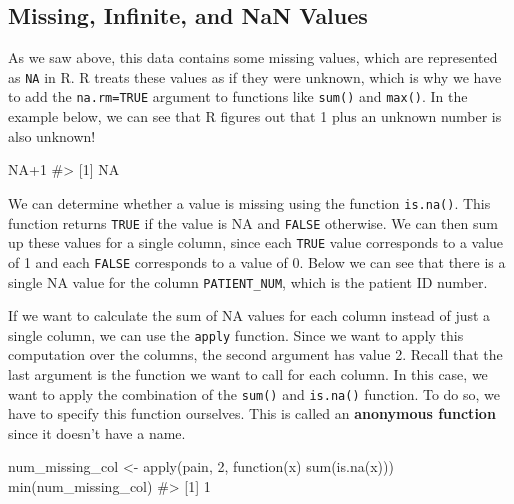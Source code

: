 \documentclass[
  letterpaper,
]{krantz}
\makeatletter
\newenvironment{Shaded}{\begin{snugshade}}{\end{snugshade}}
\newcommand{\CommentTok}[1]{\textcolor[rgb]{0.37,0.37,0.37}{#1}}
\newcommand{\ConstantTok}[1]{\textcolor[rgb]{0.56,0.35,0.01}{#1}}
\newcommand{\ControlFlowTok}[1]{\textcolor[rgb]{0.00,0.23,0.31}{#1}}
\newcommand{\DecValTok}[1]{\textcolor[rgb]{0.68,0.00,0.00}{#1}}
\newcommand{\FunctionTok}[1]{\textcolor[rgb]{0.28,0.35,0.67}{#1}}
\newcommand{\NormalTok}[1]{\textcolor[rgb]{0.00,0.23,0.31}{#1}}
\newcommand{\OtherTok}[1]{\textcolor[rgb]{0.00,0.23,0.31}{#1}}
\newcommand{\SpecialCharTok}[1]{\textcolor[rgb]{0.37,0.37,0.37}{#1}}
\newenvironment{kframe}{%
\medskip{}
\setlength{\fboxsep}{.8em}
 \def\at@end@of@kframe{}%
 \ifinner\ifhmode%
  \def\at@end@of@kframe{\end{minipage}}%
  \begin{minipage}{\columnwidth}%
 \fi\fi%
 \def\FrameCommand##1{\hskip\@totalleftmargin \hskip-\fboxsep
 \colorbox{shadecolor}{##1}\hskip-\fboxsep
     \hskip-\linewidth \hskip-\@totalleftmargin \hskip\columnwidth}%
 \MakeFramed {\advance\hsize-\width
   \@totalleftmargin\z@ \linewidth\hsize
   \@setminipage}}%
 {\par\unskip\endMakeFramed%
 \at@end@of@kframe}
\renewenvironment{Shaded}{\begin{kframe}}{\end{kframe}}
\makeatother
\begin{document}
\hypertarget{missing-infinite-and-nan-values}{%
\subsection{Missing, Infinite, and NaN
Values}\label{missing-infinite-and-nan-values}}

As we saw above, this data contains some missing values, which are
represented as \texttt{NA} in R. R treats these values as if they were
unknown, which is why we have to add the \texttt{na.rm=TRUE} argument to
functions like \texttt{sum()} and \texttt{max()}. In the example below,
we can see that R figures out that 1 plus an unknown number is also
unknown!

\begin{Shaded}
\begin{Highlighting}[]
\ConstantTok{NA}\SpecialCharTok{+}\DecValTok{1}
\CommentTok{\#\textgreater{} [1] NA}
\end{Highlighting}
\end{Shaded}

We can determine whether a value is missing using the function
\texttt{is.na()}. This function returns \texttt{TRUE} if the value is NA
and \texttt{FALSE} otherwise. We can then sum up these values for a
single column, since each \texttt{TRUE} value corresponds to a value of
1 and each \texttt{FALSE} corresponds to a value of 0. Below we can see
that there is a single NA value for the column \texttt{PATIENT\_NUM},
which is the patient ID number.

\begin{Shaded}
\end{Shaded}

If we want to calculate the sum of NA values for each column instead of
just a single column, we can use the \texttt{apply} function. Since we
want to apply this computation over the columns, the second argument has
value 2. Recall that the last argument is the function we want to call
for each column. In this case, we want to apply the combination of the
\texttt{sum()} and \texttt{is.na()} function. To do so, we have to
specify this function ourselves. This is called an \textbf{anonymous
function} since it doesn't have a name.

\begin{Shaded}
\begin{Highlighting}[]
\NormalTok{num\_missing\_col }\OtherTok{\textless{}{-}} \FunctionTok{apply}\NormalTok{(pain, }\DecValTok{2}\NormalTok{, }\ControlFlowTok{function}\NormalTok{(x) }\FunctionTok{sum}\NormalTok{(}\FunctionTok{is.na}\NormalTok{(x)))}
\FunctionTok{min}\NormalTok{(num\_missing\_col)}
\CommentTok{\#\textgreater{} [1] 1}
\end{Highlighting}
\end{Shaded}
\end{document}

